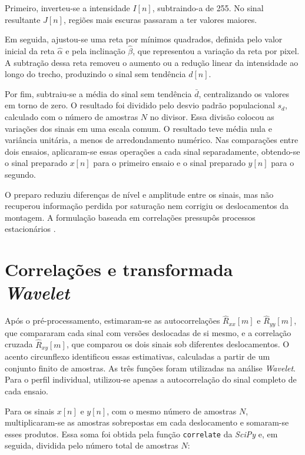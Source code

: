 \noindent
Primeiro, inverteu-se a intensidade $I[n]$, subtraindo-a de 255. No sinal
resultante $J[n]$, regiões mais escuras passaram a ter valores maiores.

Em seguida, ajustou-se uma reta por mínimos quadrados, definida pelo valor
inicial da reta $\widehat\alpha$ e pela inclinação $\widehat\beta$, que
representou a variação da reta por pixel. A subtração dessa reta removeu o
aumento ou a redução linear da intensidade ao longo do trecho, produzindo
o sinal sem tendência $d[n]$.

Por fim, subtraiu-se a média do sinal sem tendência $\bar d$, centralizando
os valores em torno de zero. O resultado foi dividido pelo desvio padrão
populacional $s_d$, calculado com o número de amostras $N$ no divisor.
Essa divisão colocou as variações dos sinais em uma escala comum. O resultado
teve média nula e variância unitária, a menos de arredondamento numérico.
Nas comparações entre dois ensaios, aplicaram-se essas operações a cada
sinal separadamente, obtendo-se o sinal preparado $x[n]$ para o primeiro
ensaio e o sinal preparado $y[n]$ para o segundo.

O preparo reduziu diferenças de nível e amplitude entre os sinais, mas não
recuperou informação perdida por saturação nem corrigiu os deslocamentos da
montagem. A formulação baseada em correlações pressupôs processos estacionários
\cite{schuck2019}.

\section{Correlações e transformada \textit{Wavelet}}\label{sec:met-wco}

Após o pré-processamento, estimaram-se as autocorrelações
$\widehat R_{xx}[m]$ e $\widehat R_{yy}[m]$, que compararam cada sinal com
versões deslocadas de si mesmo, e a correlação cruzada $\widehat R_{xy}[m]$,
que comparou os dois sinais sob diferentes deslocamentos. O acento
circunflexo identificou essas estimativas, calculadas a partir de um
conjunto finito de amostras. As três funções foram utilizadas na análise
\textit{Wavelet}. Para o perfil individual, utilizou-se apenas a
autocorrelação do sinal completo de cada ensaio.

Para os sinais $x[n]$ e $y[n]$, com o mesmo número de amostras $N$,
multiplicaram-se as amostras sobrepostas em cada deslocamento e somaram-se
esses produtos. Essa soma foi obtida pela função \texttt{correlate} da
\textit{SciPy} e, em seguida, dividida pelo número total de amostras $N$:
\nopagebreak[4]

